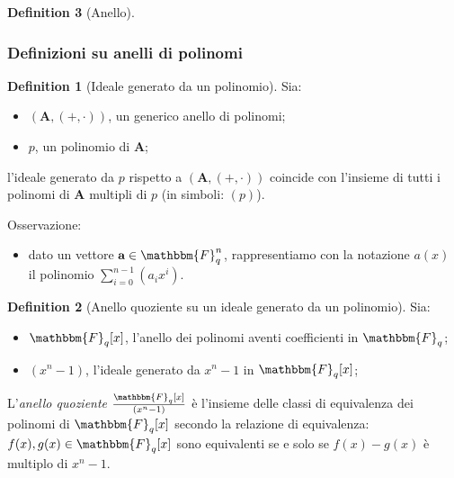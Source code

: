 \documentclass[12pt, a4paper]{report}
\theoremstyle{definition}
\newtheorem{definition}{Definition}[section]
\begin{document}
\begin{definition}[Anello]
					\subsubsection{Definizioni su anelli di polinomi}
						\begin{definition}[Ideale generato da un polinomio]
							Sia:
							\begin{itemize}
								\item $(\mathbf{A}, (+,\cdot))$, un generico anello di polinomi;
								\item $p$, un polinomio di $\mathbf{A}$;
							\end{itemize}
							\begin{center}
								l'ideale generato da $p$ rispetto a $(\mathbf{A}, (+,\cdot))$ coincide con l'insieme di tutti i polinomi di $\mathbf{A}$ multipli di $p$ (in simboli: $(p)$).
							\end{center}
							Osservazione:
							\begin{itemize}
								\item dato un vettore $\textbf{a}\in\mathbbm{F}^n_q$, rappresentiamo con la notazione $a(x)$ il polinomio $\sum_{i=0}^{n-1}(a_ix^i)$.
							\end{itemize}
						\end{definition}
						\begin{definition}[Anello quoziente su un ideale generato da un polinomio]
							Sia:
							\begin{itemize}
								\item $\mathbbm{F}_q[x]$, l'anello dei polinomi aventi coefficienti in $\mathbbm{F}_q$;
								\item $(x^n -1)$, l'ideale generato da $x^n -1$ in $\mathbbm{F}_q[x]$;
							\end{itemize}
							L'\emph{anello quoziente} $\frac{\mathbbm{F}_q[x]}{(x^n -1)}$ è l'insieme delle classi di equivalenza dei polinomi di $\mathbbm{F}_q[x]$ secondo la relazione di equivalenza: $f(x),g(x)\in\mathbbm{F}_q[x]$ sono equivalenti se e solo se $f(x)-g(x)$ è multiplo di $x^n -1$.
						\end{definition}
				\end{definition}
				
\end{document}
